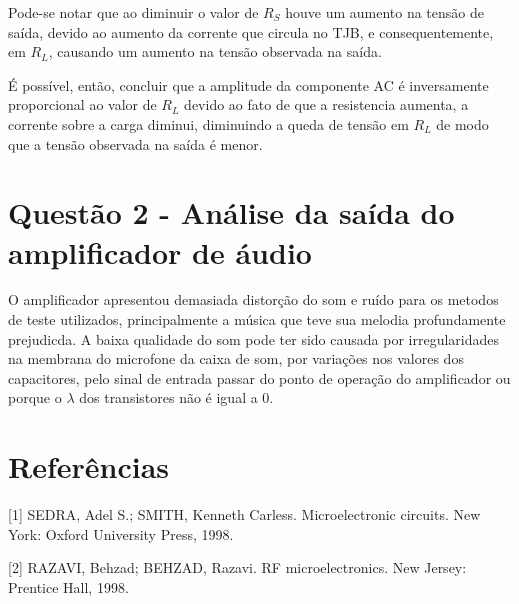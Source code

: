 \documentclass{abntex2}
\begin{document}
Pode-se notar que ao diminuir o valor de $R_S$ houve um aumento na tensão de saída, devido ao aumento da corrente que circula no TJB, e consequentemente, em $R_L$, causando um aumento na tensão observada na saída.

É possível, então, concluir que a amplitude da componente AC é inversamente proporcional ao valor de $R_L$ devido ao fato de que a resistencia aumenta, a corrente sobre a carga diminui, diminuindo a queda de tensão em $R_L$ de modo que a tensão observada na saída é menor.

\section{Questão 2 - Análise da saída do amplificador de áudio}

O amplificador apresentou demasiada distorção do som e ruído para os metodos de teste utilizados, principalmente a música que teve sua melodia profundamente prejudicda. A baixa qualidade do som pode ter sido causada por irregularidades na membrana do microfone da caixa de som, por variações nos valores dos capacitores, pelo sinal de entrada passar do ponto de operação do amplificador ou porque o $\lambda$ dos transistores não é igual a 0.

\clearpage

\section*{Referências}

[1] SEDRA, Adel S.; SMITH, Kenneth Carless. Microelectronic circuits. New York: Oxford University Press, 1998.

[2] RAZAVI, Behzad; BEHZAD, Razavi. RF microelectronics. New Jersey: Prentice Hall, 1998.
\end{document}
